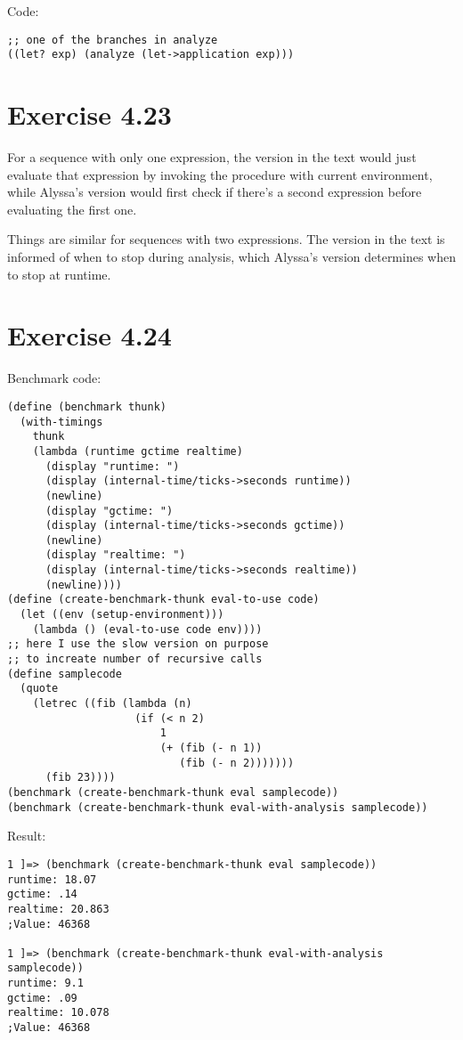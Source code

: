 \documentclass[../main.tex]{subfiles}
\begin{document}
Code:

\begin{lstlisting}
;; one of the branches in analyze
((let? exp) (analyze (let->application exp)))
\end{lstlisting}

\section{Exercise 4.23}

For a sequence with only one expression, the version in the text would just evaluate that expression by invoking the procedure with current environment, while Alyssa's version would first check if there's a second expression before evaluating the first one.

Things are similar for sequences with two expressions. The version in the text is informed of when to stop during analysis, which Alyssa's version determines when to stop at runtime.

\section{Exercise 4.24}

Benchmark code:

\begin{lstlisting}
(define (benchmark thunk)
  (with-timings
    thunk
    (lambda (runtime gctime realtime)
      (display "runtime: ")
      (display (internal-time/ticks->seconds runtime))
      (newline)
      (display "gctime: ")
      (display (internal-time/ticks->seconds gctime))
      (newline)
      (display "realtime: ")
      (display (internal-time/ticks->seconds realtime))
      (newline))))
(define (create-benchmark-thunk eval-to-use code)
  (let ((env (setup-environment)))
    (lambda () (eval-to-use code env))))
;; here I use the slow version on purpose
;; to increate number of recursive calls
(define samplecode
  (quote
    (letrec ((fib (lambda (n)
                    (if (< n 2)
                        1
                        (+ (fib (- n 1))
                           (fib (- n 2)))))))
      (fib 23))))
(benchmark (create-benchmark-thunk eval samplecode))
(benchmark (create-benchmark-thunk eval-with-analysis samplecode))
\end{lstlisting}

Result:

\begin{lstlisting}
1 ]=> (benchmark (create-benchmark-thunk eval samplecode))
runtime: 18.07
gctime: .14
realtime: 20.863
;Value: 46368

1 ]=> (benchmark (create-benchmark-thunk eval-with-analysis samplecode))
runtime: 9.1
gctime: .09
realtime: 10.078
;Value: 46368
\end{lstlisting}
\end{document}

